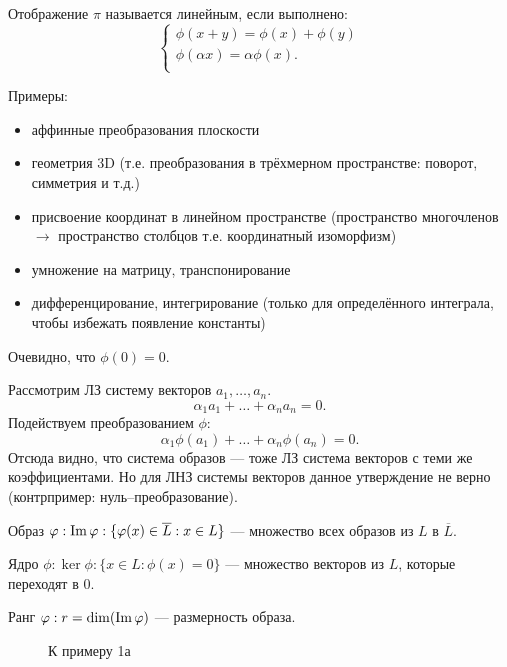 \begin{definition}
	Отображение $\pi$ называется \textsf{линейным}, если выполнено:
	$$
	\left\{
	\begin{array}{l}
	\phi(x+y)=\phi(x)+\phi(y)\\
	\phi(\alpha x)=\alpha\phi(x).\\
	\end{array}\right.
	$$
\end{definition}

Примеры:
\begin{itemize}
	\item аффинные преобразования плоскости
	\item геометрия 3D (т.е. преобразования в трёхмерном пространстве: поворот, симметрия и т.д.)
	\item присвоение координат в линейном пространстве (пространство многочленов $\rightarrow$ пространство столбцов т.е. координатный изоморфизм)
	\item умножение на матрицу, транспонирование
	\item дифференцирование, интегрирование (только для определённого интеграла, чтобы избежать появление константы)
\end{itemize}
Очевидно, что $\phi(0)=0$.

Рассмотрим ЛЗ систему векторов $a_1,\dots,a_n$.
$$
\alpha_1 a_1+\dots+\alpha_n a_n=0.
$$
Подействуем преобразованием $\phi$:
$$
\alpha_1 \phi(a_1)+\dots+\alpha_n \phi(a_n)=0.
$$
Отсюда видно, что \textsf{система образов} --- тоже ЛЗ система векторов с теми же коэффициентами. Но для ЛНЗ системы векторов данное утверждение не верно (контрпример: нуль--преобразование).

\begin{definition}
	\textsf{Образ} $\varphi: \operatorname{\mathop{Im}} \varphi:\{\varphi(x)\in \overline{L}:x\in L\}$ --- множество всех образов из $L$ в $\overline{L}$.
\end{definition}

\begin{definition}
	\textsf{Ядро} $\phi: \ker{\phi}: \{x\in L:\phi(x)=0\}$ --- множество векторов из $L$, которые переходят в 0.
\end{definition}

\begin{definition}
	\textsf{Ранг} $\varphi: r=\dim(\operatorname{\mathop{Im}}{\varphi})$ --- размерность образа.
\end{definition}

\begin{wrapfigure}{r}{0.27\linewidth}
	\def\svgwidth{5cm} %
	
	\caption{К примеру 1а}
	\label{...}
\end{wrapfigure}

